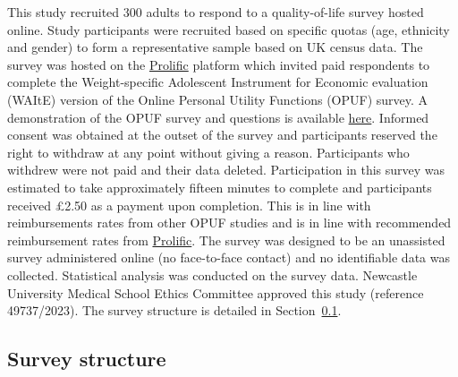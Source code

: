 \documentclass[
  number,
  preprint]{elsarticle}
\begin{document}
This study recruited 300 adults to respond to a quality-of-life survey
hosted online. Study participants were recruited based on specific
quotas (age, ethnicity and gender) to form a representative sample based
on UK census data. The survey was hosted on the
\href{https://www.prolific.com}{Prolific} platform which invited paid
respondents to complete the Weight-specific Adolescent Instrument for
Economic evaluation (WAItE) version of the Online Personal Utility
Functions (OPUF) survey. A demonstration of the OPUF survey and
questions is available
\href{https://survey.valorem.health/waite_opuf_adult2}{here}. Informed
consent was obtained at the outset of the survey and participants
reserved the right to withdraw at any point without giving a reason.
Participants who withdrew were not paid and their data deleted.
Participation in this survey was estimated to take approximately fifteen
minutes to complete and participants received £2.50 as a payment upon
completion. This is in line with reimbursements rates from other OPUF
studies \citep{Schneider2022TheStates, Bray2024DevelopmentImpairment}
and is in line with recommended reimbursement rates from
\href{https://www.prolific.com}{Prolific}. The survey was designed to be
an unassisted survey administered online (no face-to-face contact) and
no identifiable data was collected. Statistical analysis was conducted
on the survey data. Newcastle University Medical School Ethics Committee
approved this study (reference 49737/2023). The survey structure is
detailed in Section~\ref{sec-surveystructure}.

\subsection{Survey structure}\label{sec-surveystructure}
\end{document}
